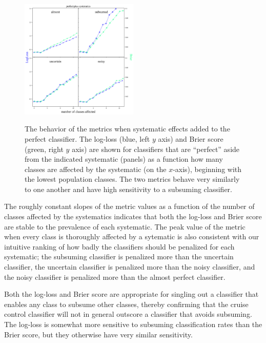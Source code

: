 \begin{figure}
	\begin{center}
		\label{fig:cruise}
		\includegraphics[width=0.5\textwidth]{./fig/systematics_onlyperfect.png}
		\caption{The behavior of the metrics when systematic effects added to the perfect classifier.
		The log-loss (blue, left $y$ axis) and Brier score (green, right $y$ axis) are shown for classifiers that are ``perfect'' aside from the indicated systematic (panels) as a function how many classes are affected by the systematic (on the $x$-axis), beginning with the lowest population classes.
		The two metrics behave very similarly to one another and have high sensitivity to a subsuming classifier.}
	\end{center}
\end{figure}

The roughly constant slopes of the metric values as a function of the number of classes affected by the systematics indicates that both the log-loss and Brier score are stable to the prevalence of each systematic.
The peak value of the metric when every class is thoroughly affected by a sytematic is also consistent with our intuitive ranking of how badly the classifiers should be penalized for each systematic; the subsuming classifier is penalized more than the uncertain classifier, the uncertain classifier is penalized more than the noisy classifier, and the noisy classifier is penalized more than the almost perfect classifier.

Both the log-loss and Brier score are appropriate for singling out a classifier that enables any class to subsume other classes, thereby confirming that the cruise control classifier will not in general outscore a classifier that avoids subsuming.
The log-loss is somewhat more sensitive to subsuming classification rates than the Brier score, but they otherwise have very similar sensitivity.

